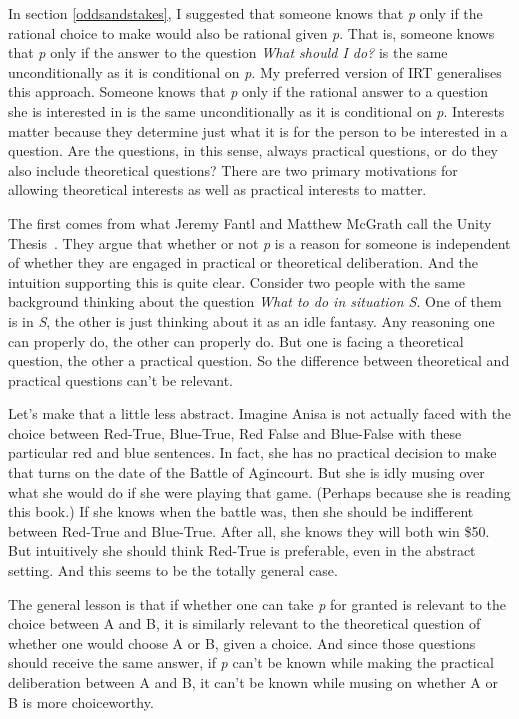 \documentclass[
  11pt,
]{book}
\begin{document}
In section \ref{oddsandstakes}, I suggested that someone knows that \emph{p} only if the rational choice to make would also be rational given \emph{p}. That is, someone knows that \emph{p} only if the answer to the question \emph{What should I do?} is the same unconditionally as it is conditional on \emph{p}. My preferred version of IRT generalises this approach. Someone knows that \emph{p} only if the rational answer to a question she is interested in is the same unconditionally as it is conditional on \emph{p}. Interests matter because they determine just what it is for the person to be interested in a question. Are the questions, in this sense, always practical questions, or do they also include theoretical questions? There are two primary motivations for allowing theoretical interests as well as practical interests to matter.

The first comes from what Jeremy Fantl and Matthew McGrath call the Unity Thesis~\citep[ 73-76]{FantlMcGrath2009}. They argue that whether or not \emph{p} is a reason for someone is independent of whether they are engaged in practical or theoretical deliberation. And the intuition supporting this is quite clear. Consider two people with the same background thinking about the question \emph{What to do in situation S}. One of them is in \emph{S}, the other is just thinking about it as an idle fantasy. Any reasoning one can properly do, the other can properly do. But one is facing a theoretical question, the other a practical question. So the difference between theoretical and practical questions can't be relevant.

Let's make that a little less abstract. Imagine Anisa is not actually faced with the choice between Red-True, Blue-True, Red False and Blue-False with these particular red and blue sentences. In fact, she has no practical decision to make that turns on the date of the Battle of Agincourt. But she is idly musing over what she would do if she were playing that game. (Perhaps because she is reading this book.) If she knows when the battle was, then she should be indifferent between Red-True and Blue-True. After all, she knows they will both win \$50. But intuitively she should think Red-True is preferable, even in the abstract setting. And this seems to be the totally general case.

The general lesson is that if whether one can take \emph{p} for granted is relevant to the choice between A and B, it is similarly relevant to the theoretical question of whether one would choose A or B, given a choice. And since those questions should receive the same answer, if \emph{p} can't be known while making the practical deliberation between A and B, it can't be known while musing on whether A or B is more choiceworthy.
\end{document}
